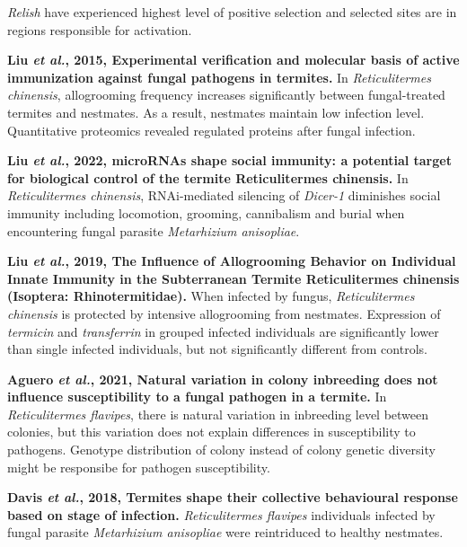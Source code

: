 \documentclass[11pt]{article}
\begin{document}
\begin{sloppypar}
\textit{Relish} have experienced highest level of positive selection and selected sites are in regions responsible for activation.
\par
\textbf{Liu \textit{et al.}, 2015, Experimental verification and molecular basis of active immunization against fungal pathogens in termites.} \newline
In \textit{Reticulitermes chinensis}, allogrooming frequency increases significantly between fungal-treated termites and nestmates. 
As a result, nestmates maintain low infection level. 
Quantitative proteomics revealed regulated proteins after fungal infection.
\par
\textbf{Liu \textit{et al.}, 2022, microRNAs shape social immunity: a potential target for biological control of the termite Reticulitermes chinensis.} \newline
In \textit{Reticulitermes chinensis}, RNAi-mediated silencing of \textit{Dicer-1} diminishes social immunity including locomotion, grooming, cannibalism and burial when encountering fungal parasite \textit{Metarhizium anisopliae}. 
\par
\textbf{Liu \textit{et al.}, 2019, The Influence of Allogrooming Behavior on Individual Innate Immunity in the Subterranean Termite Reticulitermes chinensis (Isoptera: Rhinotermitidae).} \newline
When infected by fungus, \textit{Reticulitermes chinensis} is protected by intensive allogrooming from nestmates. 
Expression of \textit{termicin} and \textit{transferrin} in grouped infected individuals are significantly lower than single infected individuals, but not significantly different from controls.
\par
\textbf{Aguero \textit{et al.}, 2021, Natural variation in colony inbreeding does not influence susceptibility to a fungal pathogen in a termite.} \newline
In \textit{Reticulitermes flavipes}, there is natural variation in inbreeding level between colonies, but this variation does not explain differences in susceptibility to pathogens. 
Genotype distribution of colony instead of colony genetic diversity might be responsibe for pathogen susceptibility. 
\par
\textbf{Davis \textit{et al.}, 2018, Termites shape their collective behavioural response based on stage of infection.} \newline
\textit{Reticulitermes flavipes} individuals infected by fungal parasite \textit{Metarhizium anisopliae} were reintriduced to healthy nestmates. 

\end{sloppypar}
\end{document}
